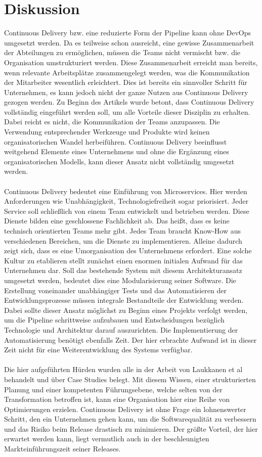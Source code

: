 \section{Diskussion}
Continuous Delivery bzw. eine reduzierte Form der Pipeline kann ohne DevOps umgesetzt werden. Da es teilweise schon ausreicht, eine gewisse Zusammenarbeit der Abteilungen zu ermöglichen, müssen die Teams nicht vermischt bzw. die Organisation umstrukturiert werden. Diese Zusammenarbeit erreicht man bereits, wenn relevante Arbeitsplätze zusammengelegt werden, was die Kommunikation der Mitarbeiter wesentlich erleichtert. Dies ist bereits ein sinnvoller Schritt für Unternehmen, es kann jedoch nicht der ganze Nutzen aus Continuous Delivery gezogen werden. Zu Beginn des Artikels wurde betont, dass Continuous Delivery vollständig eingeführt werden soll, um alle Vorteile dieser Disziplin zu erhalten. Dabei reicht es nicht, die Kommunikation der Teams anzupassen. Die Verwendung entsprechender Werkzeuge und Produkte wird keinen organisatorischen Wandel herbeiführen. Continuous Delivery beeinflusst weitgehend Elemente eines Unternehmens und ohne die Ergänzung eines organisatorischen Modells, kann dieser Ansatz nicht vollständig umgesetzt werden.\\ \\
Continuous Delivery bedeutet eine Einführung von Microservices. Hier werden Anforderungen wie Unabhängigkeit, Technologiefreiheit sogar priorisiert. Jeder Service soll schließlich von einem Team entwickelt und betrieben werden. Diese Dienste bilden eine geschlossene Fachlichkeit ab. Das heißt, dass es keine technisch orientierten Teams mehr gibt. Jedes Team braucht Know-How aus verschiedenen Bereichen, um die Dienste zu implementieren. Alleine dadurch zeigt sich, dass es eine Umorganisation des Unternehmens erfordert. Eine solche Kultur zu etablieren stellt zunächst einen enormen initialen Aufwand für das Unternehmen dar. Soll das bestehende System mit diesem Architekturansatz umgesetzt werden, bedeutet dies eine Modularisierung seiner Software. Die Erstellung voneinander unabhängiger Tests und das Automatisieren der Entwicklungsprozesse müssen integrale Bestandteile der Entwicklung werden. Dabei sollte dieser Ansatz möglichst zu Beginn eines Projekts verfolgt werden, um die Pipeline schrittweise aufzubauen und Entscheidungen bezüglich Technologie und Architektur darauf auszurichten. Die Implementierung der Automatisierung benötigt ebenfalls Zeit. Der hier erbrachte Aufwand ist in dieser Zeit nicht für eine Weiterentwicklung des Systems verfügbar. \\ \\
Die hier aufgeführten Hürden wurden alle in der Arbeit von Laukkanen et al behandelt und über Case Studies belegt. Mit diesem Wissen, einer strukturierten Planung und einer kompetenten Führungsebene, welche selten von der Transformation betroffen ist, kann eine Organisation hier eine Reihe von Optimierungen erzielen. Continuous Delivery ist ohne Frage ein lohnenswerter Schritt, den ein Unternehmen gehen kann, um die Softwarequalität zu verbessern und das Risiko beim Release drastisch zu minimieren. Der größte Vorteil, der hier erwartet werden kann, liegt vermutlich auch in der beschleunigten Markteinführungszeit seiner Releases. 

